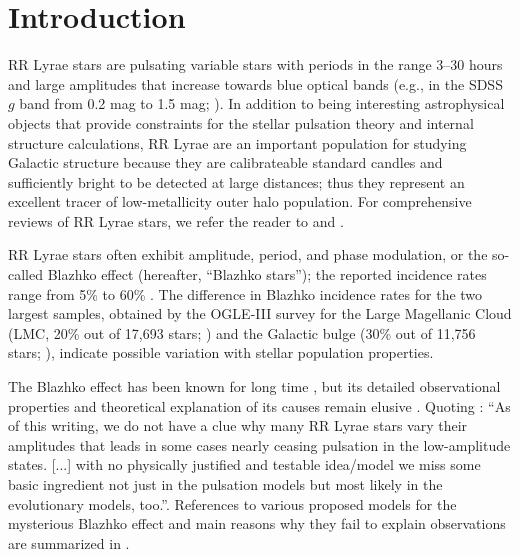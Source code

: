 
\section{Introduction\label{sec:intro}}


RR Lyrae stars are pulsating variable stars with periods in the range 3--30 hours and large amplitudes
that increase towards blue optical bands (e.g., in the SDSS $g$ band from 0.2 mag to 1.5 mag;
\citealt{2010ApJ...708..717S}). In addition to being interesting astrophysical objects that provide
constraints for the stellar pulsation theory and internal structure calculations, RR Lyrae are an important
population for studying  Galactic structure because they are calibrateable standard candles and sufficiently
bright to be detected at large distances;  thus they represent an excellent tracer of low-metallicity outer
halo population. For comprehensive reviews of RR Lyrae stars, we refer the reader to \cite{1995CAS....27.....S}
and \cite{2009Ap&SS.320..261C}.

RR Lyrae stars often exhibit amplitude, period, and phase modulation, or the so-called Blazhko effect (hereafter,
``Blazhko stars''); the reported incidence rates range from 5\% \citep{2007MNRAS.377.1263S} to 60\%
\citep{2014A&A...570A.100S}. The difference in Blazhko incidence rates for the two largest samples, obtained
by the OGLE-III survey for the Large Magellanic Cloud (LMC, 20\% out of 17,693 stars; \citealt{2009AcA....59....1S})
and the Galactic bulge (30\% out of 11,756 stars; \citealt{2011AcA....61....1S}),
indicate possible variation with stellar population properties.

The Blazhko effect has been known for long time \citep{1907AN....175..325B}, but its detailed observational
properties and theoretical explanation of its causes remain elusive \cite{2009AIPC.1170..261K}.
Quoting \cite{2016CoKon.105...61K}: ``As of this writing, we do not have a clue why many RR Lyrae
stars vary their amplitudes that leads in some cases nearly ceasing pulsation in the low-amplitude
states. [...] with no physically justified and testable idea/model we miss some basic ingredient not just
in the pulsation models but most likely in the evolutionary models, too.''. 
References to various proposed models for the mysterious Blazhko effect and main
reasons why they fail to explain observations are summarized in \cite{2016CoKon.105...61K}. 

